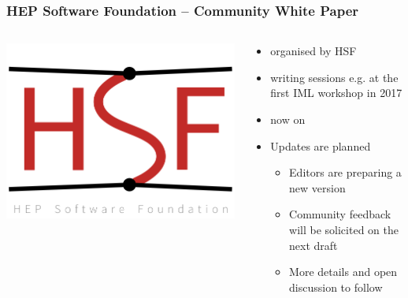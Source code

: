 \maketitle

\begin{frame}
  \frametitle{HEP Software Foundation -- Community White Paper}
  \begin{columns}
    \begin{column}{.3\textwidth}
      \includegraphics[width=\textwidth]{./hsf_logo_angled.png}
    \end{column}
    \begin{column}{.7\textwidth}
      \begin{itemize}
        \item organised by HSF
        \item writing sessions e.g. at the first IML workshop in 2017
        \item now on 
        \item Updates are planned
          \begin{itemize}
            \item Editors are preparing a new version
            \item Community feedback will be solicited on the next draft
            \item More details and open discussion to follow
          \end{itemize}
      \end{itemize}
    \end{column}
  \end{columns}
\end{frame}

